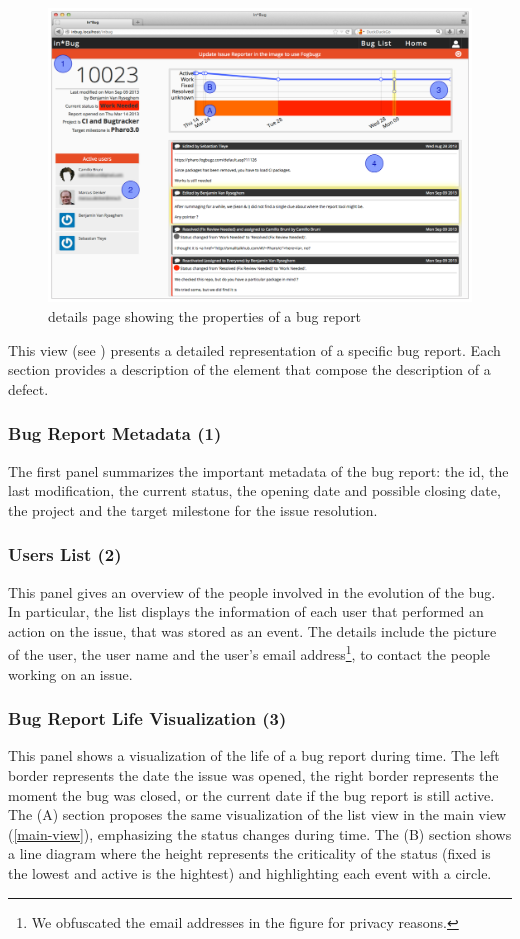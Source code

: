 \begin{figure}[ht]
\centering
\includegraphics[width=\linewidth]{Images/visualize/details-page.pdf}
\caption{\ib details page showing the properties of a bug report}
\label{fig:inbug-home}
\end{figure}

This view (see ) presents a detailed representation of a specific bug report.
Each section provides a description of the element that compose the description of a defect.


\subsubsection{Bug Report Metadata (1)}
The first panel summarizes the important metadata of the bug report: the id, the last modification, the current status, the opening date and possible closing date, the project and the target milestone for the issue resolution.

\subsubsection{Users List (2)}
This panel gives an overview of the people involved in the evolution of the bug.
In particular, the list displays the information of each user that performed an action on the issue, that was stored as an event.
The details include the picture of the user, the user name and the user's email address\footnote{We obfuscated the email addresses in the figure for privacy reasons.}, to contact the people working on an issue.

\subsubsection{Bug Report Life Visualization (3)}
This panel shows a visualization of the life of a bug report during time.
The left border represents the date the issue was opened, the right border represents the moment the bug was closed, or the current date if the bug report is still active.
The (A) section proposes the same visualization of the list view in the main view (\ref{main-view}), emphasizing the status changes during time.
The (B) section shows a line diagram where the height represents the criticality of the status (\ie fixed is the lowest and active is the hightest) and highlighting each event with a circle.

